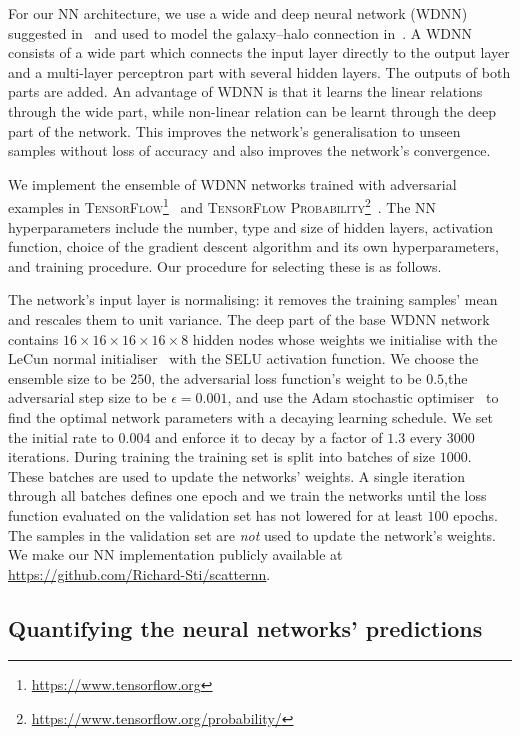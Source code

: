 \documentclass[useAMS,usenatbib]{mnras}
\begin{document}
For our \ac{NN} architecture, we use a wide and deep neural network (WDNN) suggested in~\cite{Cheng_wide_deep} and used to model the galaxy--halo connection in~\cite{Moster_GalaxyNet}. A WDNN consists of a wide part which connects the input layer directly to the output layer and a multi-layer perceptron part with several hidden layers. The outputs of both parts are added. An advantage of WDNN is that it learns the linear relations through the wide part, while non-linear relation can be learnt through the deep part of the network. This improves the network's generalisation to unseen samples without loss of accuracy and also improves the network's convergence.

We implement the ensemble of WDNN networks trained with adversarial examples in \textsc{TensorFlow}\footnote{\url{https://www.tensorflow.org}}~\citep{tensorflow2015-whitepaper} and \textsc{TensorFlow Probability}\footnote{\url{https://www.tensorflow.org/probability/}}~\citep{TensorFlow_probability}. The \ac{NN} hyperparameters include the number, type and size of hidden layers, activation function, choice of the gradient descent algorithm and its own hyperparameters, and training procedure. Our procedure for selecting these is as follows.

The network's input layer is normalising: it removes the training samples' mean and rescales them to unit variance. The deep part of the base WDNN network contains $16\times 16\times 16\times 16 \times 8$ hidden nodes whose weights we initialise with the LeCun normal initialiser~\citep{lecun-98b} with the SELU activation function.  We choose the ensemble size to be $250$, the adversarial loss function's weight to be $0.5$,the adversarial step size to be $\epsilon=0.001$, and use the Adam stochastic optimiser~\citep{Adam_Kingma} to find the optimal network parameters with a decaying learning schedule. We set the initial rate to $0.004$ and enforce it to decay by a factor of $1.3$ every $3000$ iterations.
During training the training set is split into batches of size $1000$. These batches are used to update the networks' weights. A single iteration through all batches defines one epoch and we train the networks until the loss function evaluated on the validation set has not lowered for at least $100$ epochs. The samples in the validation set are \emph{not} used to update the network's weights.
We make our \ac{NN} implementation publicly available at \url{https://github.com/Richard-Sti/scatternn}.

\subsection{Quantifying the neural networks' predictions}\label{sec:NN_prediction}
\end{document}
